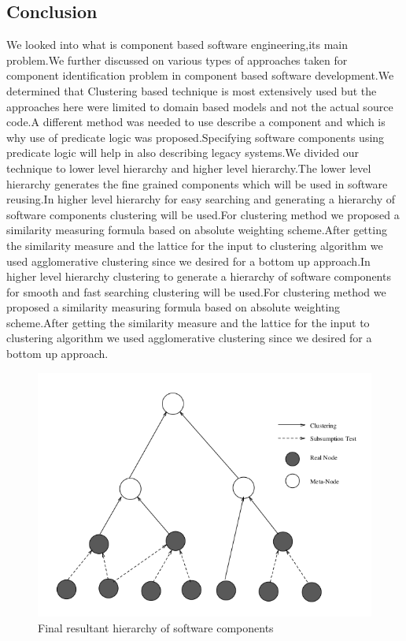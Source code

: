 \documentclass[12pt]{article}
\begin{document}
\subsection{Conclusion}
We looked into what is component based software engineering,its main problem.We further discussed on various types of approaches taken for component identification problem in component based software development.We determined that Clustering based technique is most extensively used but the approaches here were limited to domain based models and not the actual source code.A different method was needed to use describe a component and which is why use of predicate logic was proposed.Specifying software components using predicate logic will help in also describing legacy systems.We divided our technique to lower level hierarchy and higher level hierarchy.The lower level hierarchy generates the fine grained components which will be used in software reusing.In higher level hierarchy for easy searching and generating a hierarchy of software components clustering will be used.For clustering method we proposed a similarity measuring formula based on absolute weighting scheme.After getting the similarity measure and the lattice for the input to clustering algorithm we used agglomerative clustering since we desired for a bottom up approach.In higher level hierarchy clustering to generate a hierarchy of software components for smooth and fast searching clustering will be used.For clustering method we proposed a similarity measuring formula based on absolute weighting scheme.After getting the similarity measure and the lattice for the input to clustering algorithm we used agglomerative clustering since we desired for a bottom up approach.

\begin{figure}[H]
	
	\begin{center}
		\includegraphics[scale=0.4]{finalHierarchy.png}
	\end{center}
	\caption{Final resultant hierarchy of software components\cite{formal}}
	

\end{figure}
\end{document}
